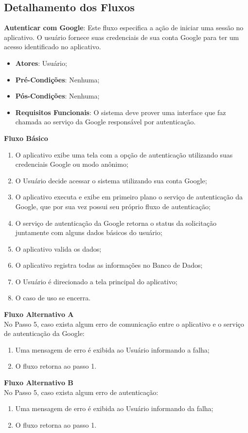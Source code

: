 \subsection*{Detalhamento dos Fluxos}
\begin{lista}
  \item \textbf{Autenticar com Google}: Este fluxo especifica a ação de iniciar uma sessão no aplicativo. O usuário fornece suas credenciais de sua conta Google para ter um acesso identificado no aplicativo.
    \begin{itemize}
    \item \textbf{Atores}: Usuário;
    \item \textbf{Pré-Condições}: Nenhuma;
    \item \textbf{Pós-Condições}: Nenhuma;
    \item \textbf{Requisitos Funcionais}: O sistema deve prover uma interface que faz chamada ao serviço da Google responsável por autenticação.
    \end{itemize}
	
    \textbf{Fluxo Básico}
    \begin{enumerate}
    \item O aplicativo exibe uma tela com a opção de autenticação utilizando suas credenciais Google ou modo anônimo;
    \item O Usuário decide acessar o sistema utilizando sua conta Google;
    \item O aplicativo executa e exibe em primeiro plano o serviço de autenticação da Google, que por sua vez possui seu próprio fluxo de autenticação;
    \item O serviço de autenticação da Google retorna o status da solicitação juntamente com alguns dados básicos do usuário;
    \item O aplicativo valida os dados;
    \item O aplicativo registra todas as informações no Banco de Dados;
    \item O Usuário é direcionado a tela principal do aplicativo;
    \item O caso de uso se encerra.
    \end{enumerate}
    
    \textbf{Fluxo Alternativo A} \\
    No Passo 5, caso exista algum erro de comunicação entre o aplicativo e o serviço de autenticação da Google:
    \begin{enumerate}
    \item Uma mensagem de erro é exibida ao Usuário informando a falha;
    \item O fluxo retorna ao passo 1.
    \end{enumerate}
    
    \textbf{Fluxo Alternativo B} \\
    No Passo 5, caso exista algum erro de autenticação:
    \begin{enumerate}
    \item Uma mensagem de erro é exibida ao Usuário informando da falha;
    \item O fluxo retorna ao passo 1.
    \end{enumerate}
\end{lista}
\pagebreak

